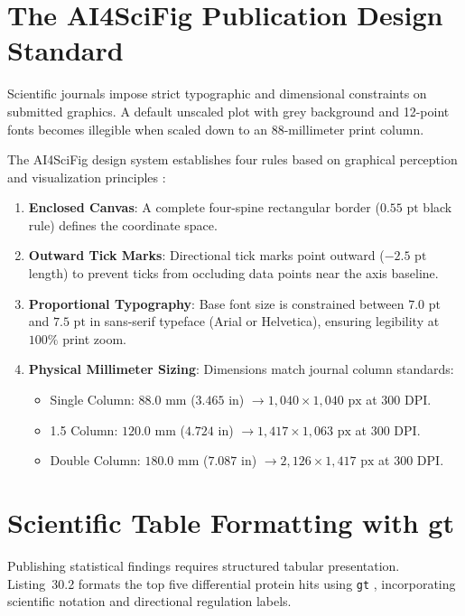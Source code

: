 \documentclass[11pt,twoside,openright]{book}
\begin{document}
\FloatBarrier
\section{The AI4SciFig Publication Design Standard}
\label{sec:ai4scifig}

Scientific journals impose strict typographic and dimensional constraints on submitted graphics. A default unscaled plot with grey background and 12-point fonts becomes illegible when scaled down to an 88-millimeter print column.

The AI4SciFig design system establishes four rules based on graphical perception and visualization principles \cite{cleveland1985elements, tufte2001visual, wickham2016ggplot2}:
\begin{enumerate}
\item \textbf{Enclosed Canvas}: A complete four-spine rectangular border ($0.55\text{ pt}$ black rule) defines the coordinate space.
\item \textbf{Outward Tick Marks}: Directional tick marks point outward ($-2.5\text{ pt}$ length) to prevent ticks from occluding data points near the axis baseline.
\item \textbf{Proportional Typography}: Base font size is constrained between $7.0\text{ pt}$ and $7.5\text{ pt}$ in sans-serif typeface (Arial or Helvetica), ensuring legibility at $100\%$ print zoom.
\item \textbf{Physical Millimeter Sizing}: Dimensions match journal column standards:
\begin{itemize}
\item Single Column: $88.0\text{ mm}$ ($3.465\text{ in}$) $\to 1{,}040 \times 1{,}040\text{ px}$ at $300\text{ DPI}$.
\item 1.5 Column: $120.0\text{ mm}$ ($4.724\text{ in}$) $\to 1{,}417 \times 1{,}063\text{ px}$ at $300\text{ DPI}$.
\item Double Column: $180.0\text{ mm}$ ($7.087\text{ in}$) $\to 2{,}126 \times 1{,}417\text{ px}$ at $300\text{ DPI}$.
\end{itemize}
\end{enumerate}

\FloatBarrier
\section{Scientific Table Formatting with gt}
\label{sec:gt_tables}

Publishing statistical findings requires structured tabular presentation. Listing~30.2 formats the top five differential protein hits using \texttt{gt} \cite{mocking2023gt}, incorporating scientific notation and directional regulation labels.
\end{document}
